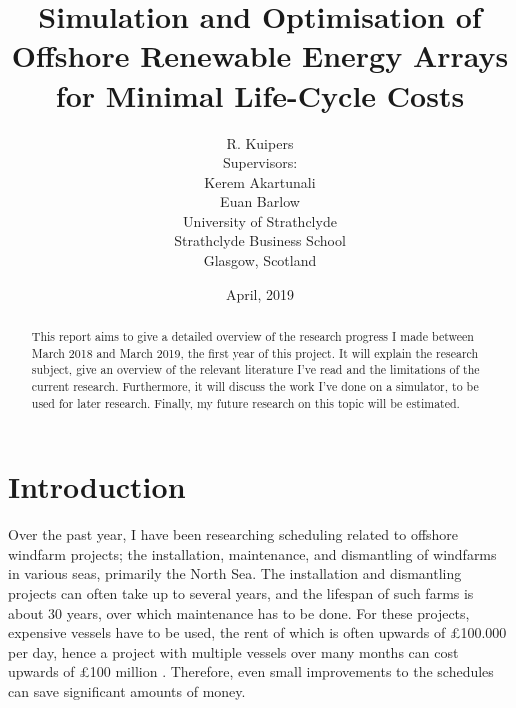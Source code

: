 \documentclass[a4paper,12pt]{article}
\begin{document}
\title{Simulation and Optimisation of Offshore Renewable Energy Arrays for Minimal Life-Cycle Costs}
\author{R. Kuipers \\[1cm] Supervisors: \\ Kerem Akartunali \\ Euan Barlow\\[2cm] University of Strathclyde \\ Strathclyde Business School \\ {\small Glasgow, Scotland}}
\date{April, 2019}

\maketitle

\pagebreak

\begin{abstract}
This report aims to give a detailed overview of the research progress I made between March 2018 and March 2019, the first year of this project. It will explain the research subject, give an overview of the relevant literature I've read and the limitations of the current research. Furthermore, it will discuss the work I've done on a simulator, to be used for later research. Finally, my future research on this topic will be estimated. 
\end{abstract}

\pagebreak

\tableofcontents

\pagebreak

\section{Introduction} \label{s:intro}
Over the past year, I have been researching scheduling related to offshore windfarm projects; the installation, maintenance, and dismantling of windfarms in various seas, primarily the North Sea. The installation and dismantling projects can often take up to several years, and the lifespan of such farms is about 30 years, over which maintenance has to be done. For these projects, expensive vessels have to be used, the rent of which is often upwards of \pounds 100.000 per day\cite{barlow2014support}, hence a project with multiple vessels over many months can cost upwards of \pounds 100 million \cite{kaiser2010offshore}. Therefore, even small improvements to the schedules can save significant amounts of money.
\end{document}
